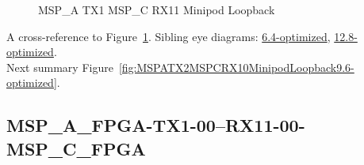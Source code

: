 \begin{figure}[h]
\begin{subfigure}{0.33\textwidth}
\hyperref[sec:MSPAFPGATX106RX1106MSPCFPGA9.6-optimized]{}
\end{subfigure}\hspace*{\fill}
\begin{subfigure}{0.33\textwidth}
\hyperref[sec:MSPAFPGATX107RX1107MSPCFPGA9.6-optimized]{}
\end{subfigure}\hspace*{\fill}
\begin{subfigure}{0.33\textwidth}
\hyperref[sec:MSPAFPGATX108RX1108MSPCFPGA9.6-optimized]{}
\end{subfigure}

\begin{subfigure}{0.33\textwidth}
\hyperref[sec:MSPAFPGATX109RX1109MSPCFPGA9.6-optimized]{}
\end{subfigure}\hspace*{\fill}
\begin{subfigure}{0.33\textwidth}
\hyperref[sec:MSPAFPGATX110RX1110MSPCFPGA9.6-optimized]{}
\end{subfigure}\hspace*{\fill}
\begin{subfigure}{0.33\textwidth}
\hyperref[sec:MSPAFPGATX111RX1111MSPCFPGA9.6-optimized]{}
\end{subfigure}

\caption{MSP\_A TX1 MSP\_C RX11 Minipod Loopback} \label{fig:MSPATX1MSPCRX11MinipodLoopback9.6-optimized}
\end{figure}

A cross-reference to Figure~\ref{fig:MSPATX1MSPCRX11MinipodLoopback9.6-optimized}.
Sibling eye diagrams: \hyperref[sec:MSPATX1MSPCRX11MinipodLoopback6.4-optimized]{6.4-optimized}, \hyperref[sec:MSPATX1MSPCRX11MinipodLoopback12.8-optimized]{12.8-optimized}. \\
Next summary Figure~\ref{fig:MSPATX2MSPCRX10MinipodLoopback9.6-optimized}.
\clearpage
% 
\subsection{MSP\_A\_FPGA-TX1-00--RX11-00-MSP\_C\_FPGA}\label{sec:MSPAFPGATX100RX1100MSPCFPGA9.6-optimized}

